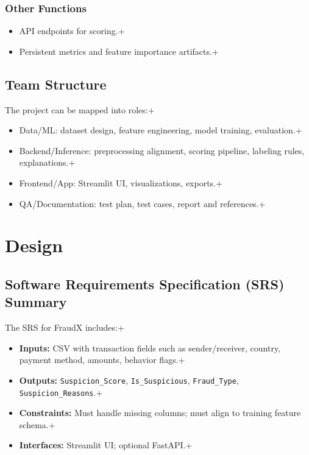 \documentclass[12pt,a4paper]{report}
\begin{document}
\subsection{Other Functions}
\begin{itemize}
  \item API endpoints for scoring.\n+  \item Persistent metrics and feature importance artifacts.\n+\end{itemize}

\section{Team Structure}
The project can be mapped into roles:\n+\begin{itemize}
  \item Data/ML: dataset design, feature engineering, model training, evaluation.\n+  \item Backend/Inference: preprocessing alignment, scoring pipeline, labeling rules, explanations.\n+  \item Frontend/App: Streamlit UI, visualizations, exports.\n+  \item QA/Documentation: test plan, test cases, report and references.\n+\end{itemize}

\chapter{Design}
\section{Software Requirements Specification (SRS) Summary}
The SRS for FraudX includes:\n+\begin{itemize}
  \item \textbf{Inputs:} CSV with transaction fields such as sender/receiver, country, payment method, amounts, behavior flags.\n+  \item \textbf{Outputs:} \texttt{Suspicion\_Score}, \texttt{Is\_Suspicious}, \texttt{Fraud\_Type}, \texttt{Suspicion\_Reasons}.\n+  \item \textbf{Constraints:} Must handle missing columns; must align to training feature schema.\n+  \item \textbf{Interfaces:} Streamlit UI; optional FastAPI.\n+\end{itemize}
\end{document}
